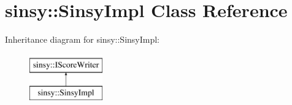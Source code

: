 \hypertarget{classsinsy_1_1SinsyImpl}{\section{sinsy\-:\-:\-Sinsy\-Impl \-Class \-Reference}
\label{classsinsy_1_1SinsyImpl}
}
\-Inheritance diagram for sinsy\-:\-:\-Sinsy\-Impl\-:\begin{figure}[H]
\begin{center}
\leavevmode
\includegraphics[height=2.000000cm]{classsinsy_1_1SinsyImpl}
\end{center}
\end{figure}
